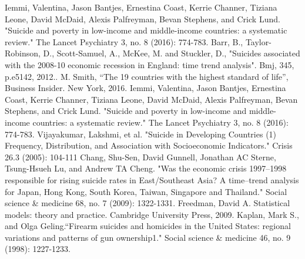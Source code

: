 \documentclass[conference]{IEEEtran}
\begin{document}
\begin{thebibliography}{00}
Iemmi, Valentina, Jason Bantjes, Ernestina Coast, Kerrie Channer, Tiziana Leone, David McDaid, Alexis Palfreyman, Bevan Stephens, and Crick Lund. "Suicide and poverty in low-income and middle-income countries: a systematic review." The Lancet Psychiatry 3, no. 8 (2016): 774-783.
 Barr, B., Taylor-Robinson, D., Scott-Samuel, A., McKee, M. and Stuckler, D., "Suicides associated with the 2008-10 economic recession in England: time trend analysis". Bmj, 345, p.e5142, 2012..
 M. Smith, ``The 19 countries with the highest standard of life'', Business Insider. New York, 2016.
 Iemmi, Valentina, Jason Bantjes, Ernestina Coast, Kerrie Channer, Tiziana Leone, David McDaid, Alexis Palfreyman, Bevan Stephens, and Crick Lund. "Suicide and poverty in low-income and middle-income countries: a systematic review." The Lancet Psychiatry 3, no. 8 (2016): 774-783.
 Vijayakumar, Lakshmi, et al. "Suicide in Developing Countries (1) Frequency, Distribution, and Association with Socioeconomic Indicators." Crisis 26.3 (2005): 104-111
 Chang, Shu-Sen, David Gunnell, Jonathan AC Sterne, Tsung-Hsueh Lu, and Andrew TA Cheng. "Was the economic crisis 1997–1998 responsible for rising suicide rates in East/Southeast Asia? A time–trend analysis for Japan, Hong Kong, South Korea, Taiwan, Singapore and Thailand." Social science \& medicine 68, no. 7 (2009): 1322-1331.
Freedman, David A. Statistical models: theory and practice. Cambridge University Press, 2009.
Kaplan, Mark S., and Olga Geling.``Firearm suicides and homicides in the United States: regional variations and patterns of gun ownership1." Social science \& medicine 46, no. 9 (1998): 1227-1233.
\end{thebibliography}
\vspace{12pt}
\end{document}
